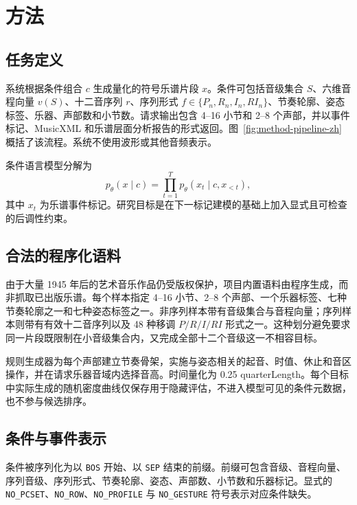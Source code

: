 \section{方法}
\label{sec:method-zh}

\subsection{任务定义}

系统根据条件组合 $c$ 生成量化的符号乐谱片段 $x$。条件可包括音级集合 $S$、六维音程向量 $v(S)$、十二音序列 $r$、序列形式 $f\in\{P_n,R_n,I_n,RI_n\}$、节奏轮廓、姿态标签、乐器、声部数和小节数。请求输出包含 4--16 小节和 2--8 个声部，并以事件标记、MusicXML 和乐谱层面分析报告的形式返回。图~\ref{fig:method-pipeline-zh} 概括了该流程。系统不使用波形或其他音频表示。

条件语言模型分解为
\begin{equation}
  p_\theta(x\mid c)=\prod_{t=1}^{T}p_\theta(x_t\mid c,x_{<t}),
  \label{eq:conditional-lm-zh}
\end{equation}
其中 $x_t$ 为乐谱事件标记。研究目标是在下一标记建模的基础上加入显式且可检查的后调性约束。

\subsection{合法的程序化语料}

由于大量 1945 年后的艺术音乐作品仍受版权保护，项目内置语料由程序生成，而非抓取已出版乐谱。每个样本指定 4--16 小节、2--8 个声部、一个乐器标签、七种节奏轮廓之一和七种姿态标签之一。非序列样本带有音级集合与音程向量；序列样本则带有有效十二音序列以及 48 种移调 $P/R/I/RI$ 形式之一。这种划分避免要求同一片段既限制在小音级集合内，又完成全部十二个音级这一不相容目标。

规则生成器为每个声部建立节奏骨架，实施与姿态相关的起音、时值、休止和音区操作，并在请求乐器音域内选择音高。时间量化为 0.25 quarterLength。每个目标中实际生成的随机密度曲线仅保存用于隐藏评估，不进入模型可见的条件元数据，也不参与候选排序。

\subsection{条件与事件表示}

条件被序列化为以 \texttt{BOS} 开始、以 \texttt{SEP} 结束的前缀。前缀可包含音级、音程向量、序列音级、序列形式、节奏轮廓、姿态、声部数、小节数和乐器标记。显式的 \texttt{NO\_PCSET}、\texttt{NO\_ROW}、\texttt{NO\_PROFILE} 与 \texttt{NO\_GESTURE} 符号表示对应条件缺失。


